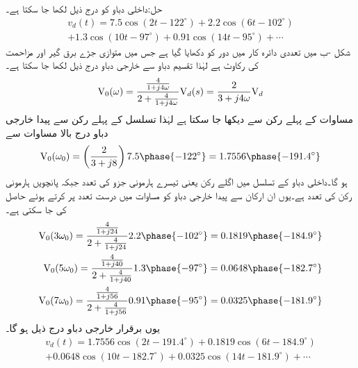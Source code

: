 حل:داخلی دباو کو درج ذیل لکھا جا سکتا ہے۔
 \begin{multline}\label{مساوات_فوریئر_لاگو_دباو_الف}
v_d(t)=7.5\cos(2t-122^{\circ})+2.2\cos(6t-102^{\circ})\\
+1.3\cos(10t-97^{\circ})+0.91\cos(14t-95^{\circ})+\cdots
\end{multline}
شکل -ب میں تعددی دائرہ کار میں دور کو دکھایا گیا ہے جس میں متوازی جڑے برق گیر اور مزاحمت کی
 رکاوٹ  ہے  لہٰذا تقسیم دباو سے خارجی دباو درج ذیل لکھا جا سکتا ہے۔
\begin{align}\label{مساوات_فوریئر_لاگو_دباو_ب}
{\ensuremath{{\textup{V}}}}_0(\omega)=\frac{\frac{4}{1+j4\omega}}{2+\frac{4}{1+j4\omega}} {{\textup{V}}}_d(s)=\frac{2}{3+j4\omega} {{\textup{V}}}_d
\end{align}
مساوات  کے پہلے رکن سے   دیکھا جا سکتا ہے لہٰذا تسلسل کے پہلے رکن سے پیدا خارجی دباو درج بالا مساوات سے
\begin{align*}
\bV_0(\omega_0)=\left(\frac{2}{3+j8}\right) 7.5\phase{-122^{\circ}} =1.7556\phase{-191.4^{\circ}}
\end{align*}
ہو گا۔داخلی دباو کے تسلسل میں اگلے رکن یعنی تیسرے ہارمونی جزو کی تعدد  جبکہ  پانچویں ہارمونی رکن کی تعدد  ہے۔یوں ان ارکان سے پیدا خارجی دباو کو مساوات  میں درست تعدد پر کرتے ہوئے حاصل کی جا سکتی ہے۔
\begin{align*}
\bV_0(3\omega_0)=\frac{\frac{4}{1+j24}}{2+\frac{4}{1+j24}} 2.2\phase{-102^{\circ}}=0.1819\phase{-184.9^{\circ}}\\
\bV_0(5\omega_0)=\frac{\frac{4}{1+j40}}{2+\frac{4}{1+j40}} 1.3\phase{-97^{\circ}}=0.0648\phase{-182.7^{\circ}}\\
\bV_0(7\omega_0)=\frac{\frac{4}{1+j56}}{2+\frac{4}{1+j56}} 0.91\phase{-95^{\circ}}=0.0325\phase{-181.9^{\circ}}
\end{align*}
یوں برقرار خارجی دباو درج ذیل ہو گا۔
 \begin{multline}
v_d(t)=1.7556\cos(2t-191.4^{\circ})+0.1819\cos(6t-184.9^{\circ})\\
+0.0648\cos(10t-182.7^{\circ})+0.0325\cos(14t-181.9^{\circ})+\cdots
\end{multline}
